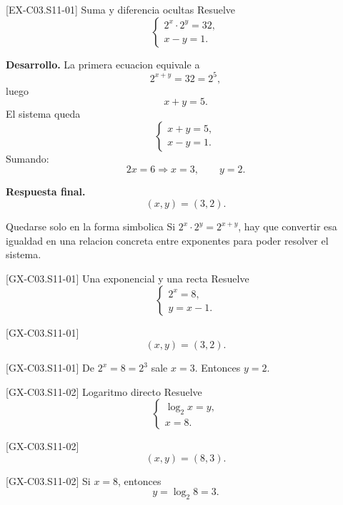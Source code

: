 \begin{solvedexample}{[EX-C03.S11-01] Suma y diferencia ocultas}
Resuelve
\[
\begin{cases}
2^x\cdot 2^y=32,\\
x-y=1.
\end{cases}
\]

\textbf{Desarrollo.} La primera ecuacion equivale a
\[
2^{x+y}=32=2^5,
\]
luego
\[
x+y=5.
\]
El sistema queda
\[
\begin{cases}
x+y=5,\\
x-y=1.
\end{cases}
\]
Sumando:
\[
2x=6 \Longrightarrow x=3,\qquad y=2.
\]

\textbf{Respuesta final.}
\[
(x,y)=(3,2).
\]
\end{solvedexample}

\begin{commonerror}{Quedarse solo en la forma simbolica}
Si \(2^x\cdot 2^y=2^{x+y}\), hay que convertir esa igualdad en una relacion concreta entre
exponentes para poder resolver el sistema.
\end{commonerror}

\begin{guidedexercise}{[GX-C03.S11-01] Una exponencial y una recta}
Resuelve
\[
\begin{cases}
2^x=8,\\
y=x-1.
\end{cases}
\]
\end{guidedexercise}

\begin{shortanswer}{[GX-C03.S11-01]}
\[
(x,y)=(3,2).
\]
\end{shortanswer}

\begin{fullsolution}{[GX-C03.S11-01]}
De \(2^x=8=2^3\) sale \(x=3\). Entonces \(y=2\).
\end{fullsolution}

\begin{guidedexercise}{[GX-C03.S11-02] Logaritmo directo}
Resuelve
\[
\begin{cases}
\log_2 x=y,\\
x=8.
\end{cases}
\]
\end{guidedexercise}

\begin{shortanswer}{[GX-C03.S11-02]}
\[
(x,y)=(8,3).
\]
\end{shortanswer}

\begin{fullsolution}{[GX-C03.S11-02]}
Si \(x=8\), entonces
\[
y=\log_2 8=3.
\]
\end{fullsolution}

